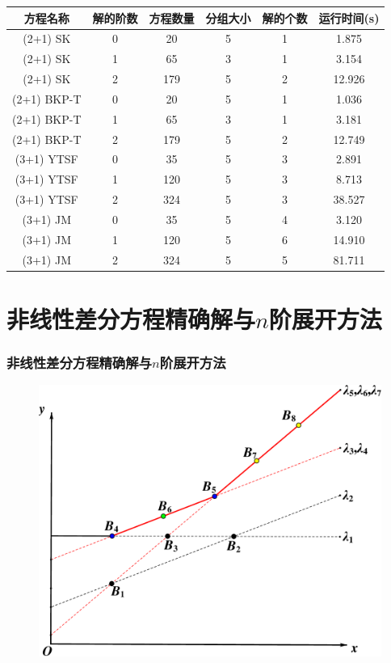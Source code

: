 \documentclass[serif]{beamer}
\begin{document}
\begin{frame}
\begin{adjustbox}{max width=\textwidth}
\renewcommand{\arraystretch}{1.3}
\begin{tabular}{cccccc}
\hline
方程名称    & 解的阶数 & 方程数量 & 分组大小 & 解的个数 & 运行时间(s) \\ 
\hline 
(2+1) SK & 0 & 20 & 5 & 1 & 1.875 \\
(2+1) SK & 1 & 65 & 3 & 1 & 3.154 \\
(2+1) SK & 2 & 179 & 5 & 2 & 12.926 \\
(2+1) BKP-T & 0 & 20 & 5 & 1 & 1.036 \\
(2+1) BKP-T & 1 & 65 & 3 & 1 & 3.181 \\
(2+1) BKP-T & 2 & 179 & 5 & 2 & 12.749 \\
(3+1) YTSF & 0 & 35 & 5 & 3 & 2.891 \\
(3+1) YTSF & 1 & 120 & 5 & 3 & 8.713 \\
(3+1) YTSF & 2 & 324 & 5 & 3 & 38.527 \\
(3+1) JM & 0 & 35 & 5 & 4 & 3.120 \\
(3+1) JM & 1 & 120 & 5 & 6 & 14.910 \\
(3+1) JM & 2 & 324 & 5 & 5 & 81.711 \\
\hline 
\end{tabular}
\end{adjustbox}
\end{frame}

\section{非线性差分方程精确解与$n$阶展开方法}
\begin{frame}
\frametitle{非线性差分方程精确解与$n$阶展开方法}
\end{frame}

\begin{frame}
\begin{figure}
\centering
\includegraphics[height=0.9\textheight]{../paper/fig/ps.pdf}
\end{figure}
\end{frame}
\end{document}
